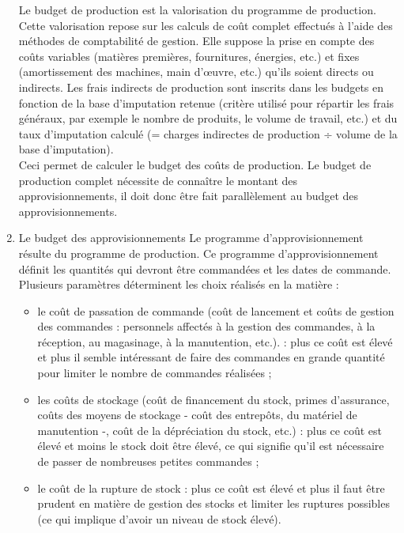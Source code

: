 \documentclass{tufte-handout}
\begin{document}
\begin{enumerate}
Le budget de production est la valorisation du programme de production. Cette valorisation repose sur les calculs de coût complet effectués à l'aide des méthodes de comptabilité de gestion. Elle suppose la prise en compte des coûts variables (matières premières, fournitures, énergies, etc.) et fixes (amortissement des machines, main d'œuvre, etc.) qu'ils soient directs ou indirects. Les frais indirects de production sont inscrits dans les budgets en fonction de la base d'imputation retenue (critère utilisé pour répartir les frais généraux, par exemple le nombre de produits, le volume de travail, etc.) et du taux d'imputation calculé (= charges indirectes de production ÷ volume de la base d'imputation).\\
Ceci permet de calculer le budget des coûts de production. Le budget de production complet nécessite de connaître le montant des approvisionnements, il doit donc être fait parallèlement au budget des approvisionnements.\\
\item Le budget des approvisionnements
\label{sec:org5669aa6}
Le programme d'approvisionnement résulte du programme de production. Ce programme d'approvisionnement définit les quantités qui devront être commandées et les dates de commande. Plusieurs paramètres déterminent les choix réalisés en la matière :\\
\begin{itemize}
\item le coût de passation de commande (coût de lancement et coûts de gestion des commandes : personnels affectés à la gestion des commandes, à la réception, au magasinage, à la manutention, etc.). : plus ce coût est élevé et plus il semble intéressant de faire des commandes en grande quantité pour limiter le nombre de commandes réalisées ;\\
\item les coûts de stockage (coût de financement du stock, primes d'assurance, coûts des moyens de stockage - coût des entrepôts, du matériel de manutention -, coût de la dépréciation du stock, etc.) : plus ce coût est élevé et moins le stock doit être élevé, ce qui signifie qu'il est nécessaire de passer de nombreuses petites commandes ;\\
\item le coût de la rupture de stock : plus ce coût est élevé et plus il faut être prudent en matière de gestion des stocks et limiter les ruptures possibles (ce qui implique d'avoir un niveau de stock élevé).\\

\end{itemize}
\end{enumerate}
\end{document}
